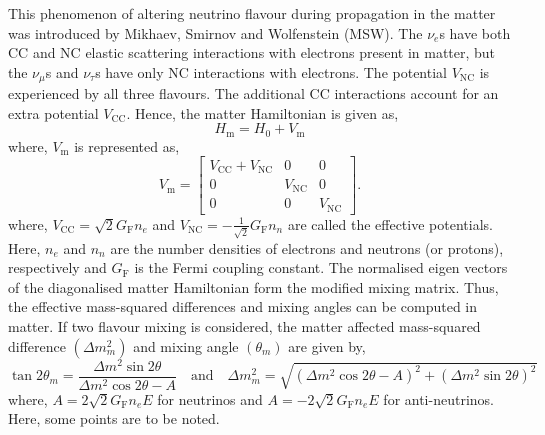 This phenomenon of altering neutrino flavour during propagation in the
matter was introduced by Mikhaev, Smirnov and Wolfenstein
(MSW)\cite{msw1}. The $\nu_{e}$s have both CC and NC elastic scattering
interactions with electrons present in matter, but the $\nu_{\mu}$s and
$\nu_{\tau}$s have only NC interactions with electrons. The potential
$V_{\textrm{NC}}$ is experienced by all three flavours. The additional
CC interactions account for an extra potential $V_{\textrm{CC}}$. Hence, the
matter Hamiltonian is given as,
\begin{equation}
  H_{\mathrm{m}} = H_{0}+V_{\mathrm{m}}
\end{equation}
where, $V_{\mathrm{m}}$ is represented as,
\begin{equation}
  V_{\mathrm{m}} =
  \begin{bmatrix}
    V_{\textrm{CC}} + V_{\textrm{NC}} & 0 & 0 \\
    0 & V_{\textrm{NC}} & 0 \\
    0 & 0 & V_{\textrm{NC}}
  \end{bmatrix}.
\end{equation}
where, $V_{\textrm{CC}} = \sqrt{2}G_{\mathrm{F}}n_{e}$ and
$V_{\textrm{NC}} = -\frac{1}{\sqrt{2}}G_{\mathrm{F}}n_{n}$ are called the effective
potentials. Here, $n_{e}$ and $n_{n}$ are the number densities of electrons and
neutrons (or protons), respectively and $G_{\mathrm{F}}$ is the Fermi coupling
constant.
The normalised eigen vectors of the diagonalised matter Hamiltonian form the
modified mixing matrix. Thus, the effective mass-squared differences and mixing
angles can be computed in matter. If two flavour mixing is considered, the
matter affected mass-squared difference $\left(\Delta m^{2}_{m}\right)$ and
mixing angle $\left(\theta_{m}\right)$ are given by,
\begin{equation}
  \tan 2\theta_{m}=\frac{\Delta m^{2}\sin 2\theta}{\Delta m^{2}\cos 2\theta -A} \quad\text{and}\quad \Delta m^{2}_{m} = \sqrt{\left(\Delta m^{2}\cos 2\theta -A\right)^{2} + \left(\Delta m^{2}\sin 2\theta\right)^{2}} \label{eq:mattermass}
\end{equation}
where, $A=2\sqrt{2}G_{\mathrm{F}}n_{e}E$ for neutrinos and
$A=-2\sqrt{2}G_{\mathrm{F}}n_{e}E$ for anti-neutrinos. Here, some points are to
be noted.
